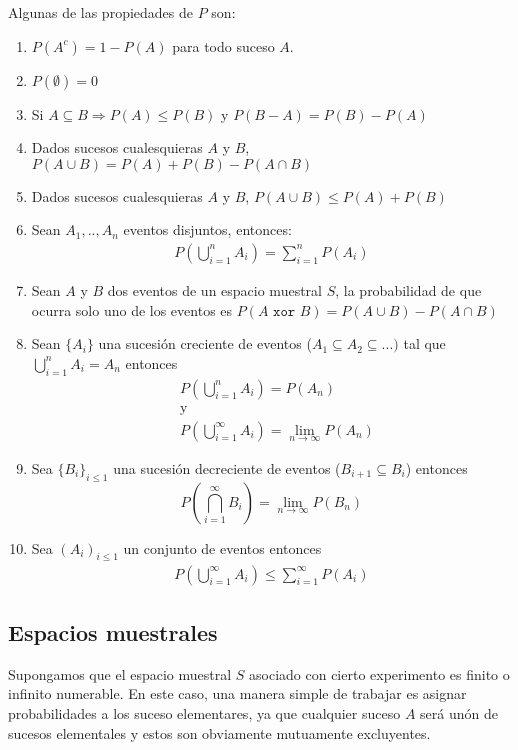 Algunas de las propiedades de $P$ son:
\begin{enumerate}
\item $P(A^c) = 1 - P(A)$ para todo suceso $A$.

\item $P(\emptyset) = 0$

\item Si $A\subseteq B\Rightarrow P(A)\leq P(B)$ y $P(B-A) = P(B)-P(A)$

\item Dados sucesos cualesquieras $A$ y $B$, $P(A\cup B) = P(A)+P(B)-P(A\cap B)$

\item Dados sucesos cualesquieras $A$ y $B$,  $P(A\cup B) \leq P(A) + P(B)$

\item Sean $A_1,..,A_n$ eventos disjuntos, entonces:
\begin{align*}
P(\bigcup_{i=1}^{n}A_i) = \sum_{i=1}^{n}P(A_i)
\end{align*}

\item Sean $A$ y $B$ dos eventos de un espacio muestral $S$, la probabilidad de que ocurra solo uno de los eventos es $P(A \texttt{ xor } B) = P(A\cup B) - P(A\cap B)$
\item Sean $\{A_i\}$ una sucesión creciente de eventos ($A_1\subseteq A_2 \subseteq ...)$ tal que $\bigcup_{i=1}^{n} A_i = A_n$ entonces \begin{align*}
&P(\bigcup_{i=1}^{n} A_i) = P(A_n) \\
&\text{y} \\
&P(\bigcup_{i=1}^{\infty} A_i) = \lim_{n\rightarrow \infty}P(A_n)
\end{align*}
\item Sea $\{B_i\}_{i\leq 1}$ una sucesión decreciente de eventos ($B_{i+1}\subseteq{B_i}$) entonces 
$$P(\bigcap_{i=1}^{\infty}B_i) = \lim_{n\rightarrow\infty}P(B_n)$$
\item Sea $(A_i)_{i\leq1}$ un conjunto de eventos entonces 
\begin{align*}
P(\bigcup_{i=1}^{\infty}A_i)\leq \sum_{i=1}^{\infty}P(A_i)
\end{align*}
\end{enumerate}
\subsection{Espacios muestrales}
Supongamos que el espacio muestral $S$ asociado con cierto experimento es finito o infinito numerable. En este caso, una manera simple de trabajar es asignar probabilidades a los suceso elementares, ya que cualquier suceso $A$ será unón de sucesos elementales y estos son obviamente mutuamente excluyentes.


